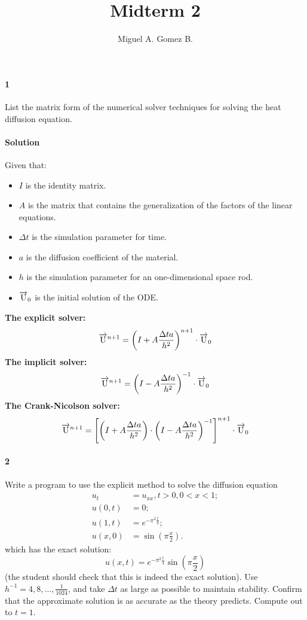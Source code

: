 \documentclass{article}
\title{Midterm	2}
\author{Miguel A. Gomez B.}
\begin{document}
	\maketitle
\paragraph{1} List the matrix form of the numerical solver techniques for solving the heat diffusion equation.
\paragraph{Solution}
Given that:
\begin{itemize}
	\item $I$ is the identity matrix.
	\item $A$ is the matrix that contains the generalization of the factors of the linear equations.
	\item $\Delta t$ is the simulation parameter for time.
	\item $a$ is the diffusion coefficient of the material.
	\item $h$ is the simulation parameter for an one-dimensional space rod.
	\item $\overrightarrow{\rm U}_0$ is the initial solution of the ODE.
\end{itemize}
\textbf{The explicit solver:}
$$ \overrightarrow{\rm U}^{n+1} = \left(I + A\frac{\Delta t a}{h^2}\right)^{n+1} \cdot \overrightarrow{\rm U}_0$$
\textbf{The implicit solver:}
$$\overrightarrow{\rm U}^{n+1} = \left(I - A\frac{\Delta t a}{h^2}\right)^{-1} \cdot \overrightarrow{\rm U}_{0}$$
\textbf{The Crank-Nicolson solver:}
$$\overrightarrow{\rm U}^{n+1} = \left[\left(I + A\frac{\Delta t a}{h^2}\right) \cdot \left(I - A \frac{\Delta t a}{h^2}\right)^{-1} \right]^{n+1} \cdot \overrightarrow{\rm U}_{0}$$
\paragraph{2} Write a program to use the explicit method to solve the diffusion equation
\begin{align*}
	u_t &= u_{xx}, t > 0, 0 < x < 1;\\
	u(0, t) &= 0; \\
	u(1, t) &= e^{-\pi^2 \frac{t}{4}}; \\
	u(x, 0) &= \sin{\left(\pi \frac{x}{2}\right)}.
\end{align*}
which has the exact solution:
$$u(x, t) = e^{-\pi^2 \frac{t}{4}} \sin{\left(\pi \frac{x}{2}\right)}$$
(the student should check that this is indeed the exact solution). Use $h^{-1} = 4, 8, \dots, \frac{1}{1024}$, and take $\Delta t$ as large as possible to maintain stability. Confirm that the approximate solution is as accurate as the theory predicts. Compute out to $t = 1$.
\end{document}
